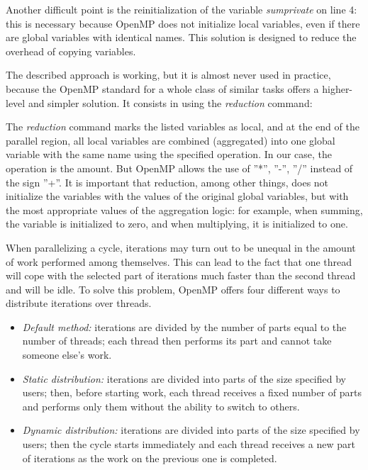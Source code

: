 {	\par Another difficult point is the reinitialization of the variable \textit{sum\textunderscore private} on line 4: this is necessary because OpenMP does not initialize local variables, even if there are global variables with identical names. This solution is designed to reduce the overhead of copying variables.
	\par The described approach is working, but it is almost never used in practice, because the OpenMP standard for a whole class of similar tasks offers a higher-level and simpler solution. It consists in using the \textit{reduction} command:
	\begin{figure}[H]
		
	\end{figure}
	\par The \textit{reduction} command marks the listed variables as local, and at the end of the parallel region, all local variables are combined (aggregated) into one global variable with the same name using the specified operation. In our case, the operation is the amount. But OpenMP allows the use of  ''*'', ''-'', ''/'' instead of the sign ''+''. It is important that reduction, among other things, does not initialize the variables with the values of the original global variables, but with the most appropriate values of the aggregation logic: for example, when summing, the variable is initialized to zero, and when multiplying, it is initialized to one.
	\par When parallelizing a cycle, iterations may turn out to be unequal in the amount of work performed among themselves. This can lead to the fact that one thread will cope with the selected part of iterations much faster than the second thread and will be idle. To solve this problem, OpenMP offers four different ways to distribute iterations over threads. 
	\begin{itemize}
		\item\textit{Default method:} iterations are divided by the number of parts equal to the number of threads; each thread then performs its part and cannot take someone else's work.
		\item\textit{Static distribution:} iterations are divided into parts of the size specified by users; then, before starting work, each thread receives a fixed number of parts and performs only them without the ability to switch to others.
		\item\textit{Dynamic distribution:} iterations are divided into parts of the size specified by users; then the cycle starts immediately and each thread receives a new part of iterations as the work on the previous one is completed.

\end{itemize}}
